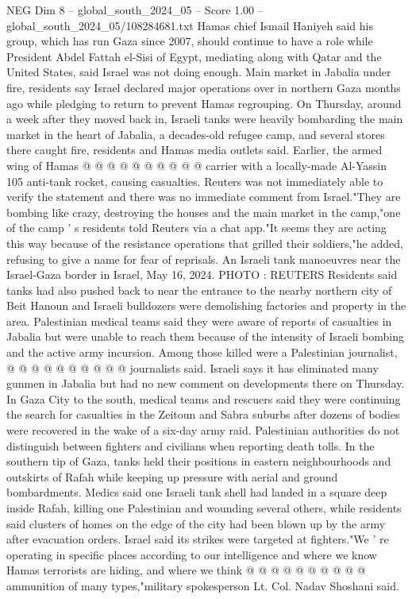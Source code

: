 \begin{textsample}{NEG Dim 8 – global\_south\_2024\_05 – Score 1.00 – global\_south\_2024\_05/108284681.txt}
Hamas chief Ismail Haniyeh said his group, which has run Gaza since 2007, should continue to have a role while President Abdel Fattah el-Sisi of Egypt, mediating along with Qatar and the United States, said Israel was not doing enough.
Main market in Jabalia under fire, residents say Israel declared major operations over in northern Gaza months ago while pledging to return to prevent Hamas regrouping.
On Thursday, around a week after they moved back in, Israeli tanks were heavily bombarding the main market in the heart of Jabalia, a decades-old refugee camp, and several stores there caught fire, residents and Hamas media outlets said.
Earlier, the armed wing of Hamas @ @ @ @ @ @ @ @ @ @ carrier with a locally-made Al-Yassin 105 anti-tank rocket, causing casualties.
Reuters was not immediately able to verify the statement and there was no immediate comment from Israel."They are bombing like crazy, destroying the houses and the main market in the camp,"one of the camp ' s residents told Reuters via a chat app."It seems they are acting this way because of the resistance operations that grilled their soldiers,"he added, refusing to give a name for fear of reprisals.
An Israeli tank manoeuvres near the Israel-Gaza border in Israel, May 16, 2024.
PHOTO : REUTERS Residents said tanks had also pushed back to near the entrance to the nearby northern city of Beit Hanoun and Israeli bulldozers were demolishing factories and property in the area.
Palestinian medical teams said they were aware of reports of casualties in Jabalia but were unable to reach them because of the intensity of Israeli bombing and the active army incursion.
Among those killed were a Palestinian journalist, @ @ @ @ @ @ @ @ @ @ journalists said.
Israeli says it has eliminated many gunmen in Jabalia but had no new comment on developments there on Thursday.
In Gaza City to the south, medical teams and rescuers said they were continuing the search for casualties in the Zeitoun and Sabra suburbs after dozens of bodies were recovered in the wake of a six-day army raid.
Palestinian authorities do not distinguish between fighters and civilians when reporting death tolls.
In the southern tip of Gaza, tanks held their positions in eastern neighbourhoods and outskirts of Rafah while keeping up pressure with aerial and ground bombardments.
Medics said one Israeli tank shell had landed in a square deep inside Rafah, killing one Palestinian and wounding several others, while residents said clusters of homes on the edge of the city had been blown up by the army after evacuation orders.
Israel said its strikes were targeted at fighters."We ' re operating in specific places according to our intelligence and where we know Hamas terrorists are hiding, and where we think @ @ @ @ @ @ @ @ @ @ ammunition of many types,"military spokesperson Lt.
Col.
Nadav Shoshani said.

\end{textsample}
